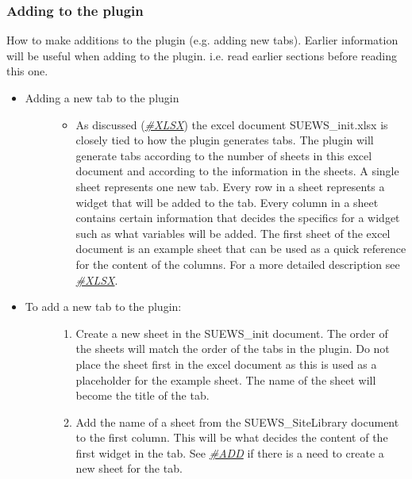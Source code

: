 \documentclass[letterpaper,10pt,english]{sphinxmanual}
\begin{document}
\subsubsection{Adding to the plugin}
\label{\detokenize{DevelopmentGuidelines:adding-to-the-plugin}}
How to make additions to the plugin (e.g. adding new tabs). Earlier information will be useful when adding to the plugin. i.e. read earlier sections before reading this one.
\begin{itemize}
\item {} \begin{description}
\item[{Adding a new tab to the plugin}] \leavevmode\begin{itemize}
\item {} 
As discussed ({\hyperref[\detokenize{DevelopmentGuidelines:XLSX}]{\emph{\#XLSX}}}) the excel document SUEWS\_init.xlsx is closely tied to how the plugin generates tabs. The plugin will generate tabs according to the number of sheets in this excel document and according to the information in the sheets. A single sheet represents one new tab. Every row in a sheet represents a widget that will be added to the tab. Every column in a sheet contains certain information that decides the specifics for a widget such as what variables will be added. The first sheet of the excel document is an example sheet that can be used as a quick reference for the content of the columns. For a more detailed description see {\hyperref[\detokenize{DevelopmentGuidelines:XLSX}]{\emph{\#XLSX}}}.

\end{itemize}

\end{description}

\item {} \begin{description}
\item[{To add a new tab to the plugin:}] \leavevmode\begin{enumerate}
\item {} 
Create a new sheet in the SUEWS\_init document. The order of the sheets will match the order of the tabs in the plugin. Do not place the sheet first in the excel document as this is used as a placeholder for the example sheet. The name of the sheet will become the title of the tab.

\item {} 
Add the name of a sheet from the SUEWS\_SiteLibrary document to the first column. This will be what decides the content of the first widget in the tab. See {\hyperref[\detokenize{DevelopmentGuidelines:ADD}]{\emph{\#ADD}}} if there is a need to create a new sheet for the tab.


\end{enumerate}
\end{description}
\end{itemize}
\end{document}
